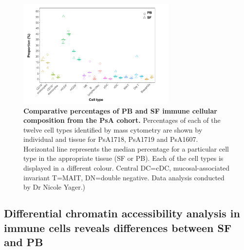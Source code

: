 \begin{figure}[H]
\centering
\includegraphics[width=0.7\textwidth]{./Results3/pdfs/PSA_ATAC_cohort_cell_type_composition_boxplots}
\caption[Comparative percentages of PB and SF immune cellular composition from the PsA cohort.]{\textbf{Comparative percentages of PB and SF immune cellular composition from the PsA cohort.} Percentages of each of the twelve cell types identified by mass cytometry are shown by individual and tissue for PsA1718, PsA1719 and PsA1607. Horizontal line represents the median percentage for a particular cell type in the appropriate tissue (SF or PB). Each of the cell types is displayed in a different colour. Central DC=cDC, mucosal-associated invariant T=MAIT, DN=double negative. Data analysis conducted by Dr Nicole Yager.)}
\label{figure:PsA_cell_composition}
\end{figure}



\subsection{Differential chromatin accessibility analysis in immune cells reveals differences between SF and PB}

